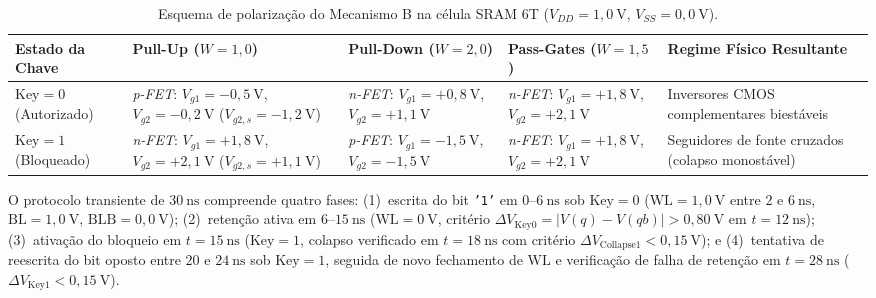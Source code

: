 \begin{table}[htbp]
\centering
\caption{Esquema de polariza\c{c}\~{a}o do Mecanismo B na c\'{e}lula SRAM 6T ($V_{DD}=1{,}0\ \text{V}$, $V_{SS}=0{,}0\ \text{V}$).}
\label{tab:sram_polarizacoes}
\footnotesize
\begin{tabularx}{\textwidth}{>{\raggedright\arraybackslash}p{2.3cm} >{\raggedright\arraybackslash}p{3.1cm} >{\raggedright\arraybackslash}p{2.9cm} >{\raggedright\arraybackslash}p{2.9cm} >{\raggedright\arraybackslash}X}
\toprule
\textbf{Estado da Chave} & \textbf{Pull-Up ($W=1{,}0$)} & \textbf{Pull-Down ($W=2{,}0$)} & \textbf{Pass-Gates ($W=1{,}5$)} & \textbf{Regime F\'{i}sico Resultante} \\
\midrule
$\text{Key}=0$ (Autorizado) & \textit{p-FET}: $V_{g1}=-0{,}5\ \text{V}$, $V_{g2}=-0{,}2\ \text{V}$ ($V_{g2,s}=-1{,}2\ \text{V}$) & \textit{n-FET}: $V_{g1}=+0{,}8\ \text{V}$, $V_{g2}=+1{,}1\ \text{V}$ & \textit{n-FET}: $V_{g1}=+1{,}8\ \text{V}$, $V_{g2}=+2{,}1\ \text{V}$ & Inversores CMOS complementares biest\'{a}veis \\
$\text{Key}=1$ (Bloqueado) & \textit{n-FET}: $V_{g1}=+1{,}8\ \text{V}$, $V_{g2}=+2{,}1\ \text{V}$ ($V_{g2,s}=+1{,}1\ \text{V}$) & \textit{p-FET}: $V_{g1}=-1{,}5\ \text{V}$, $V_{g2}=-1{,}5\ \text{V}$ & \textit{n-FET}: $V_{g1}=+1{,}8\ \text{V}$, $V_{g2}=+2{,}1\ \text{V}$ & Seguidores de fonte cruzados (colapso monost\'{a}vel) \\
\bottomrule
\end{tabularx}
\end{table}

O protocolo transiente de $30\ \text{ns}$ compreende quatro fases: (1)~escrita do bit \texttt{'1'} em $0\text{--}6\ \text{ns}$ sob $\text{Key}=0$ ($\mathrm{WL}=1{,}0\ \text{V}$ entre $2$ e $6\ \text{ns}$, $\mathrm{BL}=1{,}0\ \text{V}$, $\mathrm{BLB}=0{,}0\ \text{V}$); (2)~reten\c{c}\~{a}o ativa em $6\text{--}15\ \text{ns}$ ($\mathrm{WL}=0\ \text{V}$, crit\'{e}rio $\Delta V_{\mathrm{Key0}} = |V(q)-V(qb)| > 0{,}80\ \text{V}$ em $t=12\ \text{ns}$); (3)~ativa\c{c}\~{a}o do bloqueio em $t=15\ \text{ns}$ ($\text{Key}=1$, colapso verificado em $t=18\ \text{ns}$ com crit\'{e}rio $\Delta V_{\mathrm{Collapse1}} < 0{,}15\ \text{V}$); e (4)~tentativa de reescrita do bit oposto entre $20$ e $24\ \text{ns}$ sob $\text{Key}=1$, seguida de novo fechamento de $\mathrm{WL}$ e verifica\c{c}\~{a}o de falha de reten\c{c}\~{a}o em $t=28\ \text{ns}$ ($\Delta V_{\mathrm{Key1}} < 0{,}15\ \text{V}$).

